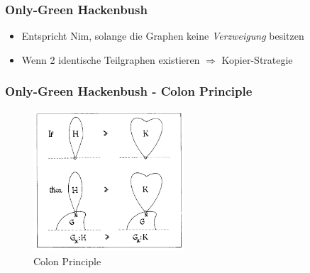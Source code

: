 \documentclass[12pt, aspectratio=169]{beamer}
\begin{document}
\begin{frame}
    \frametitle{Only-Green Hackenbush}
    \begin{itemize}
        \item<1-> Entspricht Nim, solange die Graphen keine \textit{Verzweigung} besitzen
        \item<2-> Wenn 2 identische Teilgraphen existieren $\Rightarrow$ Kopier-Strategie
    \end{itemize}
\end{frame}

\begin{frame}
    \frametitle{Only-Green Hackenbush - Colon Principle}
    \begin{figure}
        \includegraphics[width=0.5\textwidth]{pic/colon.png}
        \caption{Colon Principle \tiny{\cite{ww}}}            
    \end{figure}
\end{frame}
\end{document}
